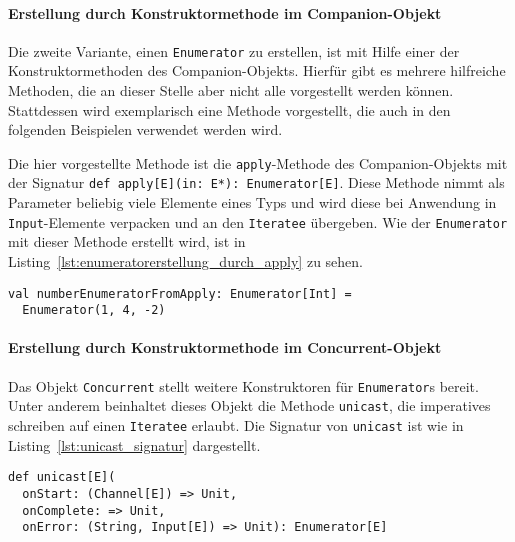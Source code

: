 \paragraph{Erstellung durch Konstruktormethode im Companion-Objekt} %
\label{par:erstellung_durch_konstruktormethode_im_companion-object}\mbox{} %

Die zweite Variante, einen \lstinline|Enumerator| zu erstellen, ist mit Hilfe einer der Konstruktormethoden des Companion-Objekts.
Hierfür gibt es mehrere hilfreiche Methoden, die an dieser Stelle aber nicht alle vorgestellt werden können.
Stattdessen wird exemplarisch eine Methode vorgestellt, die auch in den folgenden Beispielen verwendet werden wird.

Die hier vorgestellte Methode ist die \lstinline|apply|-Methode des Companion-Objekts mit der Signatur \lstinline[breaklines=true]|def apply[E](in: E*): Enumerator[E]|.
Diese Methode nimmt als Parameter beliebig viele Elemente eines Typs und wird diese bei Anwendung in \lstinline|Input|-Elemente verpacken und an den \lstinline|Iteratee| übergeben.
Wie der \lstinline|Enumerator| mit dieser Methode erstellt wird, ist in Listing~\ref{lst:enumeratorerstellung_durch_apply} zu sehen.

\begin{lstlisting}[caption=Erstellung eines Enumerators durch die apply-Konstruktormethode, label=lst:enumeratorerstellung_durch_apply]
val numberEnumeratorFromApply: Enumerator[Int] =
  Enumerator(1, 4, -2)
\end{lstlisting}


\paragraph{Erstellung durch Konstruktormethode im Concurrent-Objekt} %
\label{par:erstellung_durch_konstruktormethode_im_concurrent_objekt}\mbox{} %

Das Objekt \lstinline|Concurrent| stellt weitere Konstruktoren für \lstinline|Enumerator|s bereit.
Unter anderem beinhaltet dieses Objekt die Methode \lstinline|unicast|, die imperatives schreiben auf einen \lstinline|Iteratee| erlaubt.
Die Signatur von \lstinline|unicast| ist wie in Listing~\ref{lst:unicast_signatur} dargestellt.

\begin{lstlisting}[caption=Die Signatur von Concurrent.unicast, label=lst:unicast_signatur]
def unicast[E](
  onStart: (Channel[E]) => Unit,
  onComplete: => Unit,
  onError: (String, Input[E]) => Unit): Enumerator[E]
\end{lstlisting}

